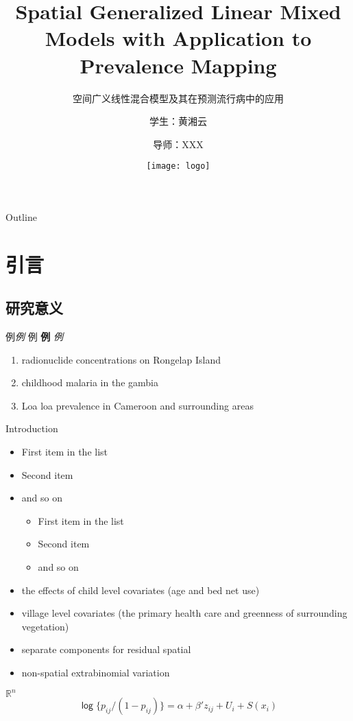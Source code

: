 \documentclass[11pt,compress,xcolor=x11names,UTF8]{beamer}
\title[Spatial Generalized Linear Mixed Models]{Spatial Generalized Linear Mixed Models with Application to Prevalence Mapping}
\subtitle{空间广义线性混合模型及其在预测流行病中的应用}
\author[黄湘云]{学生：黄湘云 \and 导师：XXX } %
\institute[中国矿业大学（北京）]{理学院 \and 计算数学与统计系\and 2015级硕士学位论文答辩} %
\date[\today]{\texttt{[image: logo]}}
\begin{document}
\maketitle

\begin{frame}{Outline}
\tableofcontents
\end{frame}

\section{引言}

\subsection{研究意义}

\begin{frame}{例\emph{例} }
\textsf{例} \textbf{例}  \textit{例} 

\begin{enumerate}
\item radionuclide concentrations on Rongelap Island
\item childhood malaria in the gambia
\item Loa loa prevalence in Cameroon and surrounding areas
\end{enumerate}

\end{frame}

\begin{frame}{Introduction}
\citet{Diggle2002}
\begin{itemize}
\item First item in the list
\item Second item
\item and so on
\begin{itemize}
\item First item in the list
\item Second item
\item and so on
\end{itemize}
\end{itemize}

\begin{itemize}
\item the effects of child level covariates (age and bed net use)
\item village level covariates (the primary health care and greenness of surrounding vegetation)
\item separate components for residual spatial
\item non-spatial extrabinomial variation
\end{itemize}
$\mathbb{R}^{n}$
$$\mathsf{\log} \{p_{ij}/(1-p_{ij})\} =\alpha + \beta'z_{ij} + U_{i} + S(x_{i})$$

\end{frame}
\end{document}
